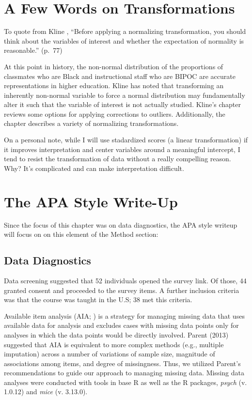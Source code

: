 \documentclass[
  english,
]{book}
\begin{document}
\hypertarget{a-few-words-on-transformations}{%
\section{A Few Words on Transformations}\label{a-few-words-on-transformations}}

To quote from Kline \citeyearpar{kline_principles_2016}, ``Before applying a normalizing transformation, you should think about the variables of interest and whether the expectation of normality is reasonable.'' (p.~77)

At this point in history, the non-normal distribution of the proportions of classmates who are Black and instructional staff who are BIPOC are accurate representations in higher education. Kline \citeyearpar{kline_principles_2016} has noted that transforming an inherently non-normal variable to force a normal distribution may fundamentally alter it such that the variable of interest is not actually studied. Kline's chapter reviews some options for applying corrections to outliers. Additionally, the chapter describes a variety of normalizing transformations.

On a personal note, while I will use stadardized scores (a linear transformation) if it improves interpretation and center variables around a meaningful intercept, I tend to resist the transformation of data without a really compelling reason. Why? It's complicated and can make interpretation difficult.

\hypertarget{the-apa-style-write-up-1}{%
\section{The APA Style Write-Up}\label{the-apa-style-write-up-1}}

Since the focus of this chapter was on data diagnostics, the APA style writeup will focus on on this element of the Method section:

\hypertarget{data-diagnostics}{%
\subsection{Data Diagnostics}\label{data-diagnostics}}

Data screening suggested that 52 individuals opened the survey link. Of those, 44 granted consent and proceeded to the survey items. A further inclusion criteria was that the course was taught in the U.S; 38 met this criteria.

Available item analysis (AIA; \citep{parent_handling_2013}) is a strategy for managing missing data that uses available data for analysis and excludes cases with missing data points only for analyses in which the data points would be directly involved. Parent (2013) suggested that AIA is equivalent to more complex methods (e.g., multiple imputation) across a number of variations of sample size, magnitude of associations among items, and degree of missingness. Thus, we utilized Parent's recommendations to guide our approach to managing missing data. Missing data analyses were conducted with tools in base R as well as the R packages, \emph{psych} (v. 1.0.12) and \emph{mice} (v. 3.13.0).
\end{document}

